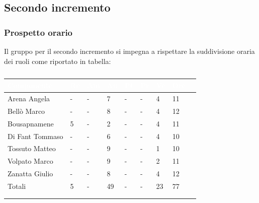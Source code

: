   \subsection{Secondo incremento} 
    {
    \subsubsection{Prospetto orario}
    {
    Il gruppo per il secondo incremento si impegna a rispettare la suddivisione oraria dei ruoli come riportato in tabella:
      \setlength{\freewidth}{\dimexpr\textwidth-30\tabcolsep}
      \renewcommand{\arraystretch}{1.0}
      \setlength{\aboverulesep}{0pt}
      \setlength{\belowrulesep}{0pt}
      \begin{longtable}{C{.4\freewidth} C{.1\freewidth} C{.1\freewidth} C{.1\freewidth} C{.1\freewidth} C{.1\freewidth} C{.1\freewidth} C{.1\freewidth} C{.1\freewidth}}
      \toprule
      \textcolor{white}{\textbf{Componente}}&
      \textcolor{white}{\textbf{Re}}&
      \textcolor{white}{\textbf{Am}}&
      \textcolor{white}{\textbf{An}}&
      \textcolor{white}{\textbf{Pt}}&
      \textcolor{white}{\textbf{Pr}}&
      \textcolor{white}{\textbf{Ve}}&
      \textcolor{white}{\textbf{Ore}}\\
      \toprule
      \endhead

      Arena Angela & - & - & 7  & - & - & 4 & 11 \\      
      Bellò Marco & - & - & 8 & - & - & 4 & 12 \\      
      Bousapnamene & 5 & - & 2 & - & - & 4 & 11 \\      
      Di Fant Tommaso & - & - & 6 & - & - & 4 & 10 \\      
      Tossuto Matteo & - & - & 9 & - & - & 1 & 10 \\      
      Volpato Marco & - & - & 9 & - & - & 2 & 11 \\      
      Zanatta Giulio & - & - & 8 & - & - & 4 & 12 \\      
      Totali & 5 & - & 49 & - & - & 23 & 77 \\
      \bottomrule
      \\
      \caption{}


\end{longtable}}}
